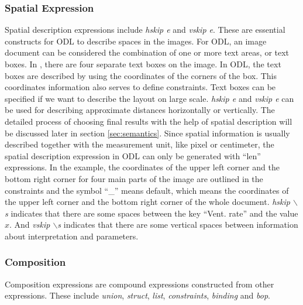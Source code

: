 {\subsubsection{Spatial Expression}
Spatial description expressions include %
{\em hskip e} and {\em vskip e}. 
These are essential constructs for ODL to describe spaces in the images. 
For ODL, an image document can be considered the combination of 
one or more text areas, or text boxes. In , 
there are four separate text boxes on the image. 
In ODL, the text boxes are described by using the coordinates of 
the corners of the box. This coordinates information also serves to define 
constraints. Text boxes can be specified if we want 
to describe the layout on large scale. 
{\em hskip e} and {\em vskip e} can be used for describing 
approximate distances horizontally or vertically. 
The detailed process of choosing final results with the 
help of spatial description will be discussed later 
in section \ref{sec:semantics}. 
Since spatial information is usually described together with the 
measurement unit, like pixel or centimeter, 
the spatial description expression in ODL can only 
be generated with ``len'' expressions. 
In the example, the coordinates of the upper left corner and 
the bottom right corner for four main parts of the image are outlined in the 
constraints and the symbol ``\_'' means default, which means the 
coordinates of the upper left corner and the bottom right corner of the 
whole document. {\em hskip $\backslash$s} indicates that there are some spaces 
between the key ``Vent. rate'' and the value $x$. And {\em vskip $\backslash$s} 
indicates that there are some vertical spaces between information about 
interpretation and parameters. 

\subsubsection{Composition}
Composition expressions are compound expressions constructed from other
expressions. These include 
{\em union}, {\em struct}, {\em list}, 
{\em constraints}, {\em binding} and {\em bop}.

}
